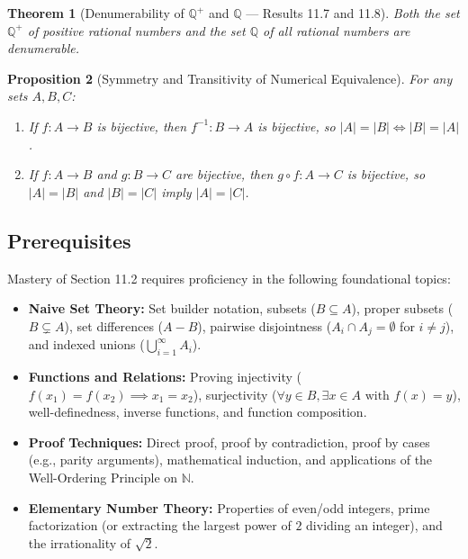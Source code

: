 \documentclass[11pt, letterpaper]{article}
\newtheorem{theorem}{Theorem}[section]
\newtheorem{proposition}[theorem]{Proposition}
\theoremstyle{definition}
\theoremstyle{remark}
\begin{document}
\begin{theorem}[Denumerability of $\mathbb{Q}^+$ and $\mathbb{Q}$ --- Results 11.7 and 11.8]
Both the set $\mathbb{Q}^+$ of positive rational numbers and the set $\mathbb{Q}$ of all rational numbers are denumerable.
\end{theorem}

\begin{proposition}[Symmetry and Transitivity of Numerical Equivalence]
For any sets $A, B, C$:
\begin{enumerate}[label=(\roman*)]
    \item If $f : A \to B$ is bijective, then $f^{-1} : B \to A$ is bijective, so $|A| = |B| \iff |B| = |A|$.
    \item If $f : A \to B$ and $g : B \to C$ are bijective, then $g \circ f : A \to C$ is bijective, so $|A| = |B|$ and $|B| = |C|$ imply $|A| = |C|$.
\end{enumerate}
\end{proposition}

\subsection{Prerequisites}

Mastery of Section 11.2 requires proficiency in the following foundational topics:
\begin{itemize}
    \item \textbf{Naive Set Theory:} Set builder notation, subsets ($B \subseteq A$), proper subsets ($B \subsetneq A$), set differences ($A - B$), pairwise disjointness ($A_i \cap A_j = \emptyset$ for $i \neq j$), and indexed unions ($\bigcup_{i=1}^\infty A_i$).
    \item \textbf{Functions and Relations:} Proving injectivity ($f(x_1) = f(x_2) \implies x_1 = x_2$), surjectivity ($\forall y \in B, \exists x \in A \text{ with } f(x) = y$), well-definedness, inverse functions, and function composition.
    \item \textbf{Proof Techniques:} Direct proof, proof by contradiction, proof by cases (e.g., parity arguments), mathematical induction, and applications of the Well-Ordering Principle on $\mathbb{N}$.
    \item \textbf{Elementary Number Theory:} Properties of even/odd integers, prime factorization (or extracting the largest power of $2$ dividing an integer), and the irrationality of $\sqrt{2}$.
\end{itemize}

\end{document}
